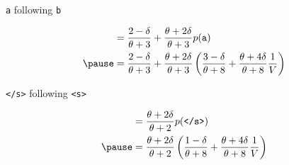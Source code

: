 \documentclass[compress]{beamer}
\begin{document}
\begin{frame}{\texttt{a} following \texttt{b}}

	\begin{align}
	=\frac{2 - \delta}{\theta + 3} + \frac{\theta + 2\delta}{\theta + 3} & p(\mbox{\texttt{a}}) \\
	\pause
	=\frac{2 - \delta}{\theta + 3} + \frac{\theta + 2\delta}{\theta + 3} & \left(\frac{3 - \delta}{\theta + 8} + \frac{\theta + 4\delta}{\theta + 8}\frac{1}{V} \right) \\
	\end{align}

\begin{center}
\end{center}

\end{frame}


\begin{frame}{\texttt{</s>} following \texttt{<s>}}

	\begin{align}
	=\frac{\theta + 2\delta}{\theta + 2} & p(\mbox{\texttt{</s>}}) \\
	\pause
	=\frac{\theta + 2\delta}{\theta + 2} & \left(\frac{1 - \delta}{\theta + 8} + \frac{\theta + 4\delta}{\theta + 8}\frac{1}{V} \right) \\
	\end{align}

\begin{center}
\end{center}

\end{frame}
\end{document}
